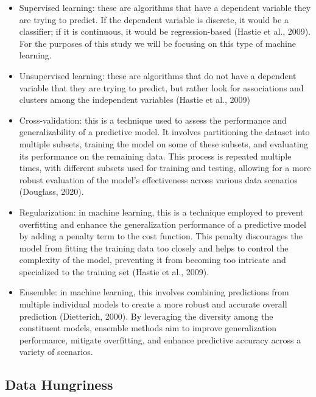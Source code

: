 \documentclass[
  man]{apa7}
\begin{document}
\begin{itemize}
\item
  Supervised learning: these are algorithms that have a dependent variable they are trying to predict.
  If the dependent variable is discrete, it would be a classifier; if it is continuous, it would be regression-based (Hastie et al., 2009).
  For the purposes of this study we will be focusing on this type of machine learning.
\item
  Unsupervised learning: these are algorithms that do not have a dependent variable that they are trying to predict, but rather look for associations and clusters among the independent variables (Hastie et al., 2009)
\item
  Cross-validation: this is a technique used to assess the performance and generalizability of a predictive model.
  It involves partitioning the dataset into multiple subsets, training the model on some of these subsets, and evaluating its performance on the remaining data.
  This process is repeated multiple times, with different subsets used for training and testing, allowing for a more robust evaluation of the model's effectiveness across various data scenarios (Douglass, 2020).
\item
  Regularization: in machine learning, this is a technique employed to prevent overfitting and enhance the generalization performance of a predictive model by adding a penalty term to the cost function.
  This penalty discourages the model from fitting the training data too closely and helps to control the complexity of the model, preventing it from becoming too intricate and specialized to the training set (Hastie et al., 2009).
\item
  Ensemble: in machine learning, this involves combining predictions from multiple individual models to create a more robust and accurate overall prediction (Dietterich, 2000).
  By leveraging the diversity among the constituent models, ensemble methods aim to improve generalization performance, mitigate overfitting, and enhance predictive accuracy across a variety of scenarios.
\end{itemize}

\hypertarget{data-hungriness}{%
\subsection{Data Hungriness}\label{data-hungriness}}
\end{document}

